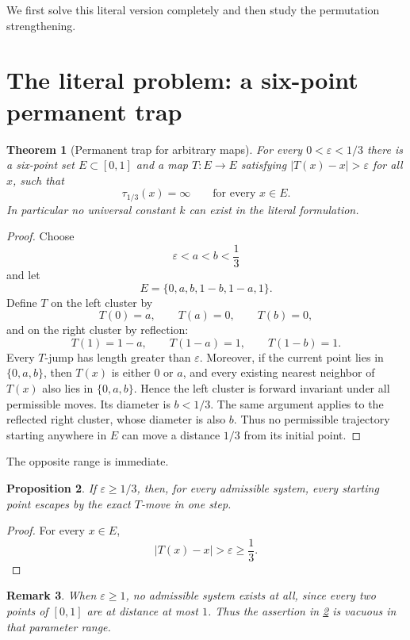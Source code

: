 \documentclass[11pt]{article}
\newtheorem{theorem}{Theorem}[section]
\newtheorem{proposition}[theorem]{Proposition}
\newtheorem{remark}[theorem]{Remark}
\newcommand{\eps}{\varepsilon}
\begin{document}
We first solve this literal version completely and then study the permutation strengthening.

\section{The literal problem: a six-point permanent trap}

\begin{theorem}[Permanent trap for arbitrary maps]\label{thm:literal-trap}
For every $0<\eps<1/3$ there is a six-point set $E\subset[0,1]$ and a map $T:E\to E$ satisfying $|T(x)-x|>\eps$ for all $x$, such that
\[
\tau_{1/3}(x)=\infty\qquad\text{for every }x\in E.
\]
In particular no universal constant $k$ can exist in the literal formulation.
\end{theorem}

\begin{proof}
Choose
\[
\eps<a<b<\frac13
\]
and let
\[
E=\{0,a,b,1-b,1-a,1\}.
\]
Define $T$ on the left cluster by
\[
T(0)=a,\qquad T(a)=0,\qquad T(b)=0,
\]
and on the right cluster by reflection:
\[
T(1)=1-a,\qquad T(1-a)=1,\qquad T(1-b)=1.
\]
Every $T$-jump has length greater than $\eps$. Moreover, if the current point lies in $\{0,a,b\}$, then $T(x)$ is either $0$ or $a$, and every existing nearest neighbor of $T(x)$ also lies in $\{0,a,b\}$. Hence the left cluster is forward invariant under all permissible moves. Its diameter is $b<1/3$. The same argument applies to the reflected right cluster, whose diameter is also $b$. Thus no permissible trajectory starting anywhere in $E$ can move a distance $1/3$ from its initial point.
\end{proof}

The opposite range is immediate.

\begin{proposition}\label{prop:literal-largeeps}
If $\eps\ge1/3$, then, for every admissible system, every starting point escapes by the exact $T$-move in one step.
\end{proposition}

\begin{proof}
For every $x\in E$,
\[
|T(x)-x|>\eps\ge\frac13.
\]
\end{proof}

\begin{remark}
When $\eps\ge1$, no admissible system exists at all, since every two points of $[0,1]$ are at distance at most $1$. Thus the assertion in \cref{prop:literal-largeeps} is vacuous in that parameter range.
\end{remark}
\end{document}
